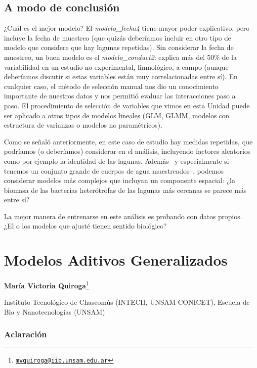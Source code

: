 \documentclass[
]{book}
\begin{document}
\hypertarget{a-modo-de-conclusiuxf3n}{%
\section{A modo de conclusión}\label{a-modo-de-conclusiuxf3n}}

¿Cuál es el mejor modelo? El \emph{modelo\_fecha4} tiene mayor poder explicativo, pero incluye la fecha de muestreo (que quizás deberíamos incluir en otro tipo de modelo que considere que hay lagunas repetidas). Sin considerar la fecha de muestreo, un buen modelo es el \emph{modelo\_conduct2}: explica más del 50\% de la variabilidad en un estudio no experimental, limnológico, a campo (aunque deberíamos discutir si estas variables están muy correlacionadas entre sí). En cualquier caso, el método de selección manual nos dio un conocimiento importante de nuestros datos y nos permitió evaluar las interacciones paso a paso. El procedimiento de selección de variables que vimos en esta Unidad puede ser aplicado a otros tipos de modelos lineales (GLM, GLMM, modelos con estructura de varianzas o modelos no paramétricos).

Como se señaló anteriormente, en este caso de estudio hay medidas repetidas, que podríamos (o deberíamos) considerar en el análisis, incluyendo factores aleatorios como por ejemplo la identidad de las lagunas. Además --y especialmente si tenemos un conjunto grande de cuerpos de agua muestreados--, podemos considerar modelos más complejos que incluyan un componente espacial: ¿la biomasa de las bacterias heterótrofas de las lagunas más cercanas se parece más entre sí?

La mejor manera de entrenarse en este análisis es probando con datos propios. ¿El o los modelos que ajusté tienen sentido biológico?

\hypertarget{gam}{%
\chapter{Modelos Aditivos Generalizados}\label{gam}}

\textbf{María Victoria Quiroga}\footnote{\href{mailto:mvquiroga@iib.unsam.edu.ar}{\nolinkurl{mvquiroga@iib.unsam.edu.ar}}}

Instituto Tecnológico de Chascomús (INTECH, UNSAM-CONICET), Escuela de Bio y Nanotecnologías (UNSAM)

\hypertarget{aclaraciuxf3n}{%
\subsection{Aclaración}\label{aclaraciuxf3n}}
\end{document}
